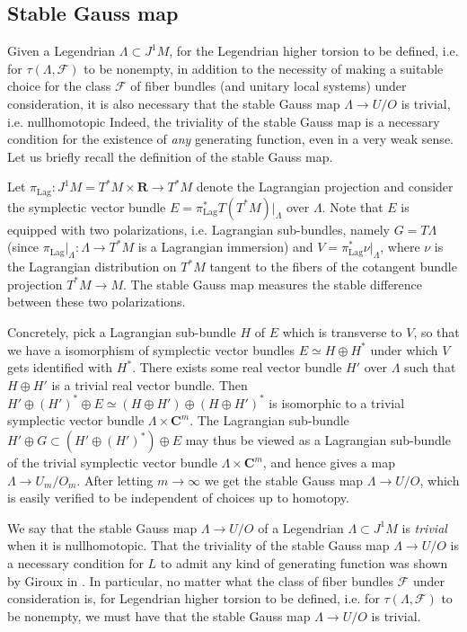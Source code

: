 \documentclass{amsart}
\newcommand\cF{\mathcal{F}}
\def\bC{\mathbf{C}}
\def\bR{\mathbf{R}}
\theoremstyle{definition}
\theoremstyle{remark}
\newtheorem{inductive lemma}[theorem]{Inductive Lemma}
\begin{document}
\subsection{Stable Gauss map} \label{sec: stable gauss map}

Given a Legendrian $\Lambda \subset J^1M$, for the Legendrian higher torsion to be defined, i.e. for $\tau(\Lambda,\cF)$ to be nonempty, in addition to the necessity of making a suitable choice for the class $\cF$ of fiber bundles (and unitary local systems) under consideration, it is also necessary that the stable Gauss map $\Lambda \to U/O$ is trivial, i.e. nullhomotopic Indeed, the triviality of the stable Gauss map is a necessary condition for the existence of {\em any} generating function, even in a very weak sense. Let us briefly recall the definition of the stable Gauss map.

 Let $\pi_{\text{Lag}} : J^1M = T^*M \times \bR \to T^*M$ denote the Lagrangian projection and consider the symplectic vector bundle $E=\pi_{\text{Lag}} ^*T(T^*M)|_\Lambda$ over $\Lambda$. Note that $E$ is equipped with two polarizations, i.e. Lagrangian sub-bundles, namely $G=T\Lambda$ (since $\pi_{\text{Lag}} |_\Lambda : \Lambda \to T^*M$ is a Lagrangian immersion) and $V=\pi_{\text{Lag}} ^*\nu|_\Lambda$, where $\nu$ is the Lagrangian distribution on $T^*M$ tangent to the fibers of the cotangent bundle projection $T^*M \to M$. The stable Gauss map measures the stable difference between these two polarizations. 
 
 Concretely, pick a Lagrangian sub-bundle $H$ of $E$ which is transverse to $V$, so that we have a isomorphism of symplectic vector bundles $E \simeq H \oplus H^*$ under which $V$ gets identified with $H^*$. There exists some real vector bundle $H'$ over $\Lambda$ such that $H \oplus H'$ is a trivial real vector bundle. Then $H' \oplus (H')^* \oplus E \simeq (H \oplus H') \oplus (H \oplus H')^*$ is isomorphic to a trivial symplectic vector bundle $\Lambda \times \bC^m$. The Lagrangian sub-bundle $H' \oplus G  \subset (H' \oplus (H')^*) \oplus E$ may thus be viewed as a Lagrangian sub-bundle of the trivial symplectic vector bundle $\Lambda \times \bC^m$, and hence gives a map $\Lambda \to U_m/O_m$. After letting $m \to \infty$ we get the stable Gauss map $\Lambda \to U/O$, which is easily verified to be independent of choices up to homotopy.  

We say that the stable Gauss map $\Lambda \to U/O$ of a Legendrian $\Lambda \subset J^1M$ is {\em trivial} when it is nullhomotopic. That the triviality of the stable Gauss map $\Lambda \to U/O$ is a necessary condition for $L$ to admit any kind of generating function was shown by Giroux in \cite{G90}. In particular, no matter what  the class of fiber bundles $\cF$ under consideration is, for  Legendrian higher torsion to be defined, i.e. for $\tau(\Lambda,\cF)$ to be nonempty, we must have that the stable Gauss map $\Lambda \to U/O$ is trivial. 
\end{document}

